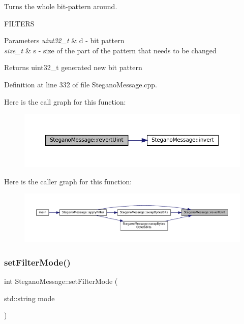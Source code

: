 Turns the whole bit-\/pattern around. 

F\+I\+L\+T\+E\+RS
\begin{DoxyParams}{Parameters}
{\em uint32\+\_\+t} & d -\/ bit pattern \\
\hline
{\em size\+\_\+t} & s -\/ size of the part of the pattern that needs to be changed \\
\hline
\end{DoxyParams}
\begin{DoxyReturn}{Returns}
uint32\+\_\+t generated new bit pattern 
\end{DoxyReturn}


Definition at line 332 of file Stegano\+Message.\+cpp.

Here is the call graph for this function\+:
\nopagebreak
\begin{figure}[H]
\begin{center}
\leavevmode
\includegraphics[width=350pt]{classSteganoMessage_a28fdc9b9da4cbbffed718d351da65fd3_cgraph}
\end{center}
\end{figure}
Here is the caller graph for this function\+:
\nopagebreak
\begin{figure}[H]
\begin{center}
\leavevmode
\includegraphics[width=350pt]{classSteganoMessage_a28fdc9b9da4cbbffed718d351da65fd3_icgraph}
\end{center}
\end{figure}
\mbox{\label{classSteganoMessage_a5c3ef910b17f4bbe32a73a33be9d7586}} 
\subsubsection{\texorpdfstring{setFilterMode()}{setFilterMode()}}
{\footnotesize\ttfamily int Stegano\+Message\+::set\+Filter\+Mode (\begin{DoxyParamCaption}\item[{std\+::string}]{mode }\end{DoxyParamCaption})}




